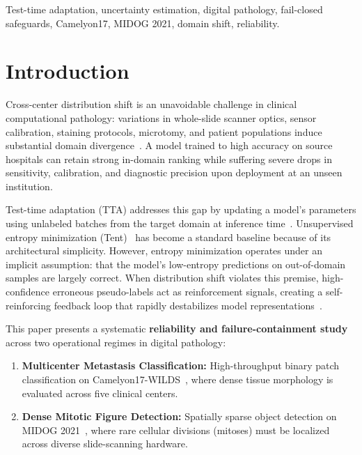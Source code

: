 \documentclass[conference]{IEEEtran}
\begin{document}
\begin{IEEEkeywords}
Test-time adaptation, uncertainty estimation, digital pathology, fail-closed safeguards, Camelyon17, MIDOG 2021, domain shift, reliability.
\end{IEEEkeywords}

\section{Introduction}
Cross-center distribution shift is an unavoidable challenge in clinical computational pathology: variations in whole-slide scanner optics, sensor calibration, staining protocols, microtomy, and patient populations induce substantial domain divergence~\cite{koh2021wilds,bandi2018camelyon17,aubreville2023mitosis}.
A model trained to high accuracy on source hospitals can retain strong in-domain ranking while suffering severe drops in sensitivity, calibration, and diagnostic precision upon deployment at an unseen institution.

Test-time adaptation (TTA) addresses this gap by updating a model's parameters using unlabeled batches from the target domain at inference time~\cite{wang2021tent,liang2023comprehensive}.
Unsupervised entropy minimization (Tent)~\cite{wang2021tent} has become a standard baseline because of its architectural simplicity.
However, entropy minimization operates under an implicit assumption: that the model's low-entropy predictions on out-of-domain samples are largely correct.
When distribution shift violates this premise, high-confidence erroneous pseudo-labels act as reinforcement signals, creating a self-reinforcing feedback loop that rapidly destabilizes model representations~\cite{histopathc2026}.

This paper presents a systematic \textbf{reliability and failure-containment study} across two operational regimes in digital pathology:
\begin{enumerate}
\item \textbf{Multicenter Metastasis Classification:} High-throughput binary patch classification on Camelyon17-WILDS~\cite{koh2021wilds}, where dense tissue morphology is evaluated across five clinical centers.
\item \textbf{Dense Mitotic Figure Detection:} Spatially sparse object detection on MIDOG 2021~\cite{aubreville2023mitosis}, where rare cellular divisions (mitoses) must be localized across diverse slide-scanning hardware.
\end{enumerate}
\end{document}
